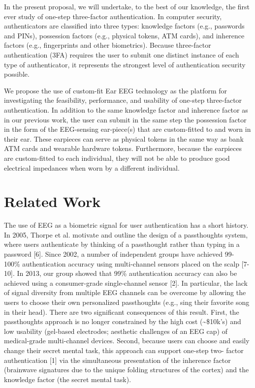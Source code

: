 \documentclass[11pt]{article}
\begin{document}
In the present proposal, we will undertake, to the best of our knowledge, the first
ever study of one-step three-factor authentication. In computer security,
authenticators are classified into three types: knowledge factors (e.g., passwords
and PINs), possession factors (e.g., physical tokens, ATM cards), and inherence
factors (e.g., fingerprints and other biometrics). Because three-factor
authentication (3FA) requires the user to submit one distinct instance of each
type of authenticator, it represents the strongest level of authentication security
possible.

We propose the use of custom-fit Ear EEG technology as the platform for
investigating the feasibility, performance, and usability of one-step three-factor
authentication. In addition to the same knowledge factor and inherence factor as
in our previous work, the user can submit in the same step the possession factor
in the form of the EEG-sensing ear-piece(s) that are custom-fitted to and worn in
their ear. These earpieces can serve as physical tokens in the same way as bank
ATM cards and wearable hardware tokens. Furthermore, because the earpieces
are custom-fitted to each individual, they will not be able to produce good
electrical impedances when worn by a different individual.

\section{Related Work}
\label{sec:org08d7c07}
The use of EEG as a biometric signal for user authentication has a short history.
In 2005, Thorpe et al. motivate and outline the design of a passthoughts system,
where users authenticate by thinking of a passthought rather than typing in a
password [6]. Since 2002, a number of independent groups have achieved 99-
100\% authentication accuracy using multi-channel sensors placed on the scalp
[7-10]. In 2013, our group showed that 99\% authentication accuracy can also be
achieved using a consumer-grade single-channel sensor [2]. In particular, the
lack of signal diversity from multiple EEG channels can be overcome by allowing
the users to choose their own personalized passthoughts (e.g., sing their favorite
song in their head). There are two significant consequences of this result. First,
the passthoughts approach is no longer constrained by the high cost (\textasciitilde{}\$10k’s)
and low usability (gel-based electrodes; aesthetic challenges of an EEG cap) of
medical-grade multi-channel devices. Second, because users can choose and
easily change their secret mental task, this approach can support one-step two-
factor authentication [1] via the simultaneous presentation of the inherence factor
(brainwave signatures due to the unique folding structures of the cortex) and the
knowledge factor (the secret mental task).
\end{document}
